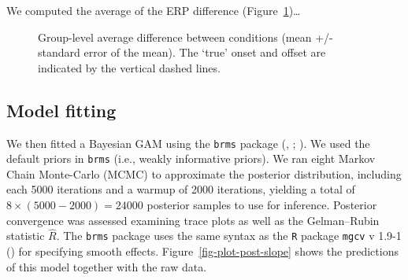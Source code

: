 \documentclass[
  doc,
  floatsintext,
  longtable,
  a4paper,
  nolmodern,
  notxfonts,
  notimes,
  colorlinks=true,linkcolor=blue,citecolor=blue,urlcolor=blue]{apa7}
\begin{document}
We computed the average of the ERP difference
(Figure~\ref{fig-erp})\ldots{}

\begin{figure}[!htb]

\caption{\label{fig-erp}Group-level average difference between
conditions (mean +/- standard error of the mean). The `true' onset and
offset are indicated by the vertical dashed lines.}


\end{figure}%

\subsection{Model fitting}\label{model-fitting}

We then fitted a Bayesian GAM using the \texttt{brms} package
(, ;
). We used the
default priors in \texttt{brms} (i.e., weakly informative priors). We
ran eight Markov Chain Monte-Carlo (MCMC) to approximate the posterior
distribution, including each 5000 iterations and a warmup of 2000
iterations, yielding a total of \(8 \times (5000-2000) = 24000\)
posterior samples to use for inference. Posterior convergence was
assessed examining trace plots as well as the Gelman--Rubin statistic
\(\hat{R}\). The \texttt{brms} package uses the same syntax as the
\texttt{R} package \texttt{mgcv} v 1.9-1 () for specifying smooth effects. Figure~\ref{fig-plot-post-slope}
shows the predictions of this model together with the raw data.
\end{document}
